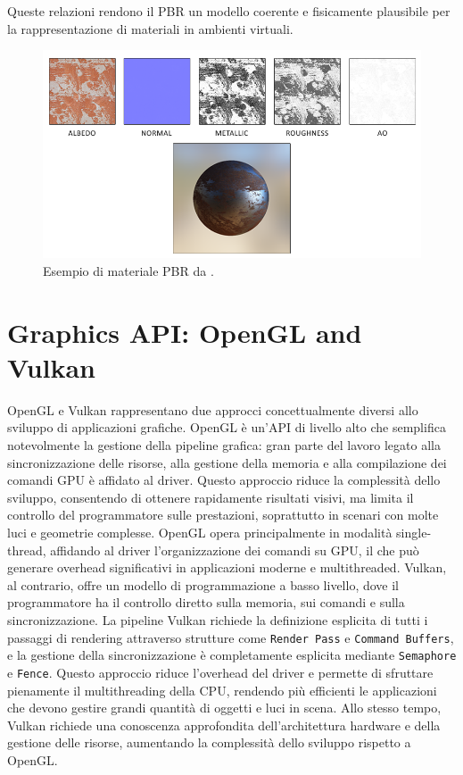 \documentclass[12pt,a4paper,openright,twoside]{book}
\begin{document}
Queste relazioni rendono il PBR un modello coerente e fisicamente plausibile per la rappresentazione
di materiali in ambienti virtuali.
\begin{figure}[H]
   \centering
   \includegraphics[width=.8\linewidth]{figures/pbr_material_example.png}
   \caption{Esempio di materiale PBR da \cite{learnopengl}.}
   \label{fig:pbr-material-example}
\end{figure}

\section{Graphics API: OpenGL and Vulkan}
OpenGL e Vulkan rappresentano due approcci concettualmente diversi allo sviluppo di applicazioni grafiche.
OpenGL è un'API di livello alto che semplifica notevolmente la gestione della pipeline grafica: gran parte del lavoro
legato alla sincronizzazione delle risorse, alla gestione della memoria e alla compilazione dei comandi GPU è affidato
al driver. Questo approccio riduce la complessità dello sviluppo, consentendo di ottenere rapidamente risultati visivi,
ma limita il controllo del programmatore sulle prestazioni, soprattutto in scenari con molte luci e geometrie complesse.
OpenGL opera principalmente in modalità single-thread, affidando al driver l'organizzazione dei comandi su GPU, il che può
generare overhead significativi in applicazioni moderne e multithreaded.
Vulkan, al contrario, offre un modello di programmazione a basso livello, dove il programmatore ha il controllo diretto
sulla memoria, sui comandi e sulla sincronizzazione. La pipeline Vulkan richiede la definizione esplicita di tutti i
passaggi di rendering attraverso strutture come \texttt{Render Pass} e \texttt{Command Buffers}, e la gestione della 
sincronizzazione è completamente esplicita mediante \texttt{Semaphore} e \texttt{Fence}. Questo approccio riduce
l'overhead del driver e permette di sfruttare pienamente il multithreading della CPU, rendendo più efficienti
le applicazioni che devono gestire grandi quantità di oggetti e luci in scena. Allo stesso tempo, Vulkan richiede
una conoscenza approfondita dell'architettura hardware e della gestione delle risorse, aumentando la complessità
dello sviluppo rispetto a OpenGL.
\end{document}
